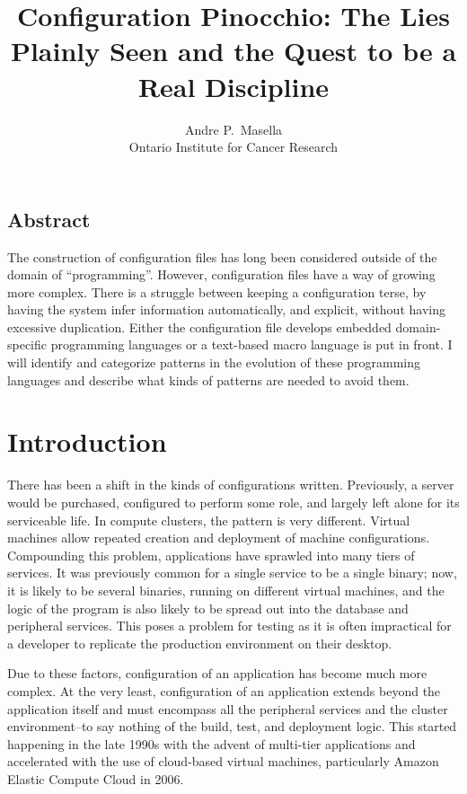 \documentclass[letterpaper,twocolumn,10pt]{article}
\begin{document}
\date{}
\title{\Large \bf Configuration Pinocchio: The Lies Plainly Seen and the Quest to be a Real Discipline}

\author{
{\rm Andre P.~Masella}\\
Ontario Institute for Cancer Research
} %

\maketitle

\thispagestyle{empty}


\subsection*{Abstract}
The construction of configuration files has long been considered outside of the domain of ``programming''. However, configuration files have a way of growing more complex. There is a struggle between keeping a configuration terse, by having the system infer information automatically, and explicit, without having excessive duplication. Either the configuration file develops embedded domain-specific programming languages or a text-based macro language is put in front. I will identify and categorize patterns in the evolution of these programming languages and describe what kinds of patterns are needed to avoid them.

\section{Introduction}
There has been a shift in the kinds of configurations written. Previously, a server would be purchased, configured to perform some role, and largely left alone for its serviceable life. In compute clusters, the pattern is very different. Virtual machines allow repeated creation and deployment of machine configurations. Compounding this problem, applications have sprawled into many tiers of services. It was previously common for a single service to be a single binary; now, it is likely to be several binaries, running on different virtual machines, and the logic of the program is also likely to be spread out into the database and peripheral services. This poses a problem for testing as it is often impractical for a developer to replicate the production environment on their desktop.

Due to these factors, configuration of an application has become much more complex. At the very least, configuration of an application extends beyond the application itself and must encompass all the peripheral services and the cluster environment--to say nothing of the build, test, and deployment logic. This started happening in the late 1990s with the advent of multi-tier applications and accelerated with the use of cloud-based virtual machines, particularly Amazon Elastic Compute Cloud in 2006.
\end{document}

